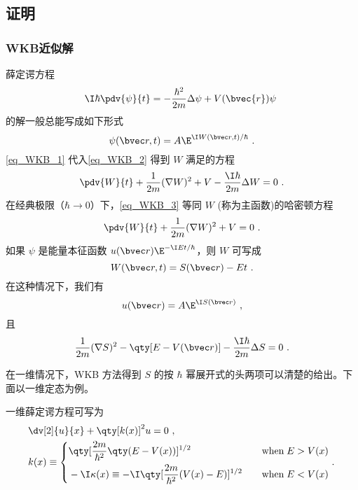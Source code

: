 \subsection{证明}
\subsubsection{WKB近似解}
薛定谔方程
\begin{equation}\label{eq_WKB_2}
\I\hbar\pdv{\psi}{t}=-\frac{\hbar^2}{2m}\Delta\psi+V(\bvec{r})\psi~
\end{equation}
的解一般总能写成如下形式
\begin{equation}\label{eq_WKB_1}
\psi(\bvec r,t)=A\E^{\I W(\bvec r,t)/\hbar}~.
\end{equation}
\autoref{eq_WKB_1} 代入\autoref{eq_WKB_2} 得到 $W$ 满足的方程
\begin{equation}\label{eq_WKB_3}
\pdv{W}{t}+\frac{1}{2m}(\nabla W)^2+V-\frac{\I\hbar}{2m}\Delta W=0~.
\end{equation}
在经典极限（$\hbar\rightarrow 0$）下，\autoref{eq_WKB_3} 等同 $W$ (称为主函数)的哈密顿方程
\begin{equation}
\pdv{W}{t}+\frac{1}{2m}(\nabla W)^2+V=0~.
\end{equation}
如果 $\psi$ 是能量本征函数 $u(\bvec r)\E^{-\I Et/\hbar}$，则 $W$ 可写成
\begin{equation}
W(\bvec r,t)=S(\bvec r)-Et~.
\end{equation}
在这种情况下，我们有
\begin{equation}
u(\bvec r)=A\E^{\I S(\bvec r)}~,
\end{equation}
且
\begin{equation}
\frac{1}{2m}(\nabla S)^2-\qty[E-V(\bvec r)]-\frac{\I\hbar}{2m}\Delta S=0~.
\end{equation}

在一维情况下，WKB 方法得到 $S$ 的按 $\hbar$ 幂展开式的头两项可以清楚的给出。下面以一维定态为例。

一维薛定谔方程可写为\cite{Sakurai}
\begin{equation}\label{eq_WKB_4}
\begin{aligned}
&\dv[2]{u}{x}+\qty[k(x)]^2u=0~,\\
&k(x)\equiv\left\{\begin{aligned}
&\qty[\frac{2m}{\hbar^2}\qty(E-V(x))]^{1/2}\quad &\text{when}\; E>V(x)\\
&-\I\kappa(x)\equiv-\I\qty[\frac{2m}{\hbar^2}(V(x)-E)]^{1/2}\quad &\text{when}\; E<V(x)
\end{aligned}~.\right.
\end{aligned}
\end{equation}


